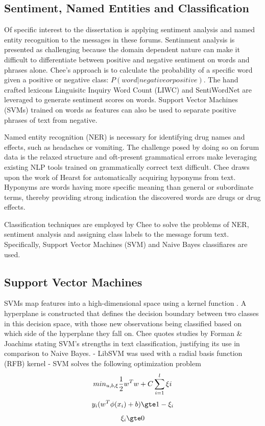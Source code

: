\documentclass[twoside,11pt]{article}
\begin{document}
\newpage

\subsection{Sentiment, Named Entities and Classification}
Of specific interest to the dissertation is applying sentiment analysis and named
entity recognition to the messages in these forums. Sentinment analysis is presented
as challenging because the domain dependent nature \citep{Turney, 2002}
can make it difficult to differentiate between positive and negative sentiment on words and phrases alone.
Chee's approach is to calculate the probability of a specific word given a positive or negative class: $P(word| negative or positive)$.
The hand crafted lexicons Linguisitc Inquiry Word Count (LIWC) and SentiWordNet
are leveraged to generate sentiment scores on words. Support Vector Machines (SVMs)
trained on words as features can also be used to separate positive phrases of
text from negative.

Named entity recognition (NER) is necessary for identifying drug names and
effects, such as headaches or vomiting. The challenge posed by doing so
on forum data is the relaxed structure and oft-present grammatical errors
make leveraging existing NLP tools trained on grammatically correct text
difficult. Chee draws upon the work of Hearst \citep{Hearst} for automatically
acquiring hyponyms from text. Hyponyms are words having more specific meaning
than general or subordinate terms, thereby providing strong indication the discovered
words are drugs or drug effects.

Classification techniques are employed by Chee to solve the problems of NER,
sentiment analysis and assigning class labels to the message forum text. Specifically,
Support Vector Machines (SVM) and Naive Bayes classifiares are used.


\subsection{Support Vector Machines}
SVMs map features into a high-dimensional space using a kernel function \citep{Cortes and Vapnik}.
A hyperplane is constructed that defines the decision boundary between two classes
in this decision space, with those new observations being classified based on which
side of the hyperplane they fall on. Chee quotes studies by Forman & Joachims stating
SVM's strengths in text classification, justifying its use in comparison to Naive
Bayes.
- LibSVM was used with a radial basis function (RFB) kernel
- SVM solves the following optimization problem
\[
  min_{u, b, \xi} \frac{1}{2}w^{T}w + C \sum_{i=1}^{l}\xi i \\
\]
\[
  y_{i}(w^{T}\phi(x_{i}) + b) \gte 1 - \xi_{i}
\]
\[
  \xi_{i} \gte 0
\]
\end{document}
